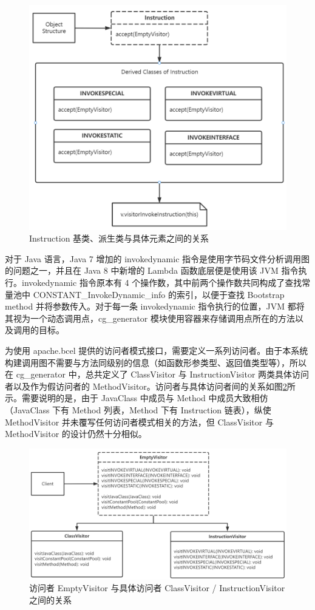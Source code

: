 \begin{figure}[htb]
    \centering
    \includegraphics[width=.8\textwidth]{figures/cg-generator-object-structure.png}
    \caption{Instruction 基类、派生类与具体元素之间的关系}
    \label{fig:cg-generator-object-structure}
\end{figure}

对于 Java 语言，Java 7 增加的 invokedynamic 指令是使用字节码文件分析调用图的问题之一，并且在 Java 8 中新增的 Lambda 函数底层便是使用该 JVM 指令执行。invokedynamic 指令原本有 4 个操作数，其中前两个操作数共同构成了查找常量池中 CONSTANT\_InvokeDynamic\_info 的索引，以便于查找 Bootstrap method 并将参数传入。对于每一条 invokedynamic 指令执行的位置，JVM 都将其视为一个动态调用点，cg\_generator 模块使用容器来存储调用点所在的方法以及调用的目标。

为使用 apache.bcel 提供的访问者模式接口，需要定义一系列访问者。由于本系统构建调用图不需要与方法同级别的信息（如函数形参类型、返回值类型等），所以在 cg\_generator 中，总共定义了 ClassVisitor 与 InstructionVisitor 两类具体访问者以及作为假访问者的 MethodVisitor。访问者与具体访问者间的关系如图\ref{fig:cg-generator-client}所示。需要说明的是，由于 JavaClass 中成员与 Method 中成员大致相仿（JavaClass 下有 Method 列表，Method 下有 Instruction 链表），纵使 MethodVisitor 并未覆写任何访问者模式相关的方法，但 ClassVisitor 与 MethodVisitor 的设计仍然十分相似。

\begin{figure}[htb]
    \centering
    \includegraphics[width=.9\textwidth]{figures/cg-generator-client.png}
    \caption{访问者 EmptyVisitor 与具体访问者 ClassVisitor / InstructionVisitor 之间的关系}
    \label{fig:cg-generator-client}
\end{figure}

